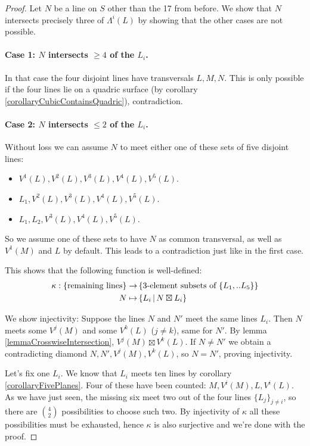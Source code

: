 \begin{proof}
Let $N$ be a line on $S$ other than the 17 from before.
We show that $N$ intersects precisely three of $\Lambda^i(L)$ by showing that the other cases are not possible.
\paragraph{Case 1: \textnormal{$N$ intersects $\geq 4$ of the $L_i$.}}
In that case the four disjoint lines have transversals $L,M,N$.
This is only possible if the four lines lie on a quadric surface (by corollary \ref{corollaryCubicContainsQuadric}), contradiction.
\paragraph{Case 2: \textnormal{$N$ intersects $\leq 2$ of the $L_i$.}}
Without loss we can assume $N$ to meet either one of these sets of five disjoint lines:
\begin{itemize}
\item $V^1(L) ,V^2(L) ,V^3(L) ,V^4(L) ,V^5(L)$.
\item $L_1,V^2(L),V^3(L) ,V^4(L) ,V^5(L)$.
\item $L_1, L_2, V^3(L) ,V^4(L) ,V^5(L)$.
\end{itemize}
So we assume one of these sets to have $N$ as common transversal, as well as $V^1(M) $ and $L$ by default.
This leads to a contradiction just like in the first case.

This shows that the following function is well-defined:
\begin{align*}
\kappa : \left\lbrace\text{remaining lines}\right\rbrace \to &\left\lbrace \text{3-element subsets of }\{L_1,..L_5\}\right\rbrace \\
N \mapsto &\left\lbrace L_i\,|\, N\boxtimes L_i\right\rbrace
\end{align*}

We show injectivity: Suppose the lines $N$ and $N'$ meet the same lines $L_i$. Then $N$ meets some $V^j(M)$ and some $V^k(L)$ ($j \neq k$), same for $N'$.
By lemma \ref{lemmaCrosswiseIntersection}, $V^j(M) \boxtimes V^k(L)$.
If $N\neq N'$ we obtain a contradicting diamond $N,N',V^j(M),V^k(L)$, so $N=N'$, proving injectivity.

Let's fix one $L_i$.
We know that $L_i$ meets ten lines by corollary \ref{corollaryFivePlanes}.
Four of these have been counted: $M,V^i(M),L,V^i(L)$.
As we have just seen, the missing six meet two out of the four lines $\{ L_j \}_{j\neq i}$, so there are $\binom{4}{2}$ possibilities to choose such two.
By injectivity of $\kappa$ all these possibilities must be exhausted, hence $\kappa$ is also surjective and we're done with the proof.
\end{proof}
